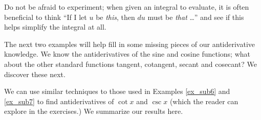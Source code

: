 
Do not be afraid to experiment; when given an integral to evaluate, it is often beneficial to think ``If I let $u$ be \textit{this}, then $du$ must be \textit{that} \ldots'' and see if this helps simplify the integral at all.


The next two examples will help fill in some missing pieces of our antiderivative knowledge. We know the antiderivatives of the sine and cosine functions; what about the other standard functions tangent, cotangent, secant and cosecant? We discover these next.



We can use similar techniques to those used in Examples \ref{ex_sub6} and \ref{ex_sub7} to find antiderivatives of $\cot x$ and $\csc x$ (which the reader can explore in the exercises.) We summarize our results here.




